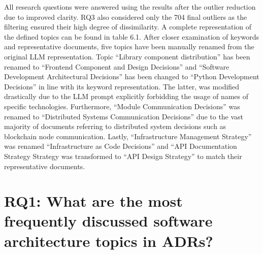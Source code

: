         All research questions were answered using the results after the outlier reduction due to improved clarity. RQ3 also considered only the 704 final outliers as the filtering ensured their high degree of dissimilarity. A complete representation of the defined topics can be found in table 6.1.
        After closer examination of keywords and representative documents, five topics have been manually renamed from the original LLM representation. Topic ``Library component distribution'' has been renamed to ``Frontend Component and Design Decisions'' and ``Software Development Architectural Decisions'' has been changed to ``Python Development Decisions'' in line with its keyword representation. The latter, was modified drastically due to the LLM prompt explicitly forbidding the usage of names of specific technologies. Furthermore, ``Module Communication Decisions'' was renamed to ``Distributed Systems Communication Decisions'' due to the vast majority of documents referring to distributed system decisions such as blockchain node communication. Lastly, ``Infrastructure Management Strategy'' was renamed ``Infrastructure as Code Decisions'' and ``API Documentation Strategy Strategy was transformed to ``API Design Strategy'' to match their representative documents. 
        
        

    \section{RQ1: What are the most frequently discussed software architecture topics in ADRs?}

